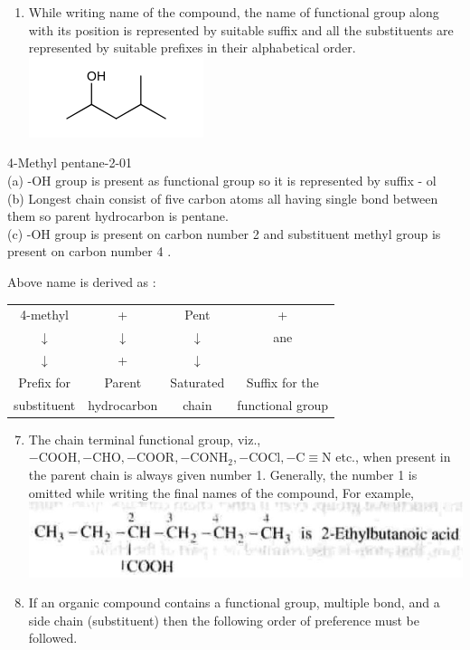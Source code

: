 \documentclass[10pt]{article}
\begin{document}
\begin{enumerate}
  \item While writing name of the compound, the name of functional group along with its position is represented by suitable suffix and all the substituents are represented by suitable prefixes in their alphabetical order.\\
\includegraphics{smile-f5bd4a4178f23e18f1a93b52192ed274cd5fab7e}
\end{enumerate}

4-Methyl pentane-2-01\\
(a) -OH group is present as functional group so it is represented by suffix - ol\\
(b) Longest chain consist of five carbon atoms all having single bond between them so parent hydrocarbon is pentane.\\
(c) -OH group is present on carbon number 2 and substituent methyl group is present on carbon number 4 .

Above name is derived as :

\begin{center}
\begin{tabular}{cccc}
4-methyl & + & Pent & + \\
$\downarrow$ & $\downarrow$ & $\downarrow$ & ane \\
$\downarrow$ & + & $\downarrow$ &  \\
Prefix for & Parent & Saturated & Suffix for the \\
substituent & hydrocarbon & chain & functional group \\
\end{tabular}
\end{center}

\begin{enumerate}
  \setcounter{enumi}{6}
  \item The chain terminal functional group, viz., $-\mathrm{COOH},-\mathrm{CHO},-\mathrm{COOR},-\mathrm{CONH}_{2},-\mathrm{COCl},-\mathrm{C} \equiv \mathrm{N}$ etc., when present in the parent chain is always given number 1. Generally, the number 1 is omitted while writing the final names of the compound, For example,\\
\includegraphics[max width=\textwidth, center]{2025_01_28_8470952b98110cec3aabg-024}
  \item If an organic compound contains a functional group, multiple bond, and a side chain (substituent) then the following order of preference must be followed.
\end{enumerate}
\end{document}
